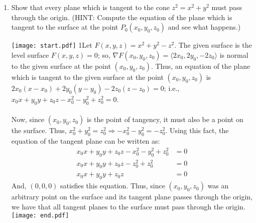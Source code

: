 \documentclass[12pt]{article}
\begin{document}
\begin{enumerate}
\item Show that every plane which is tangent to the cone $z^2=x^2+y^2$ must pass through the origin. (HINT: Compute the equation of the plane which is tangent to the surface at the point $P_0(x_0,y_0,z_0)$ and see what happens.)

\texttt{[image: start.pdf]}
{{{1\linewidth}{Let $F(x,y,z)=x^2+y^2-z^2$.  The given surface is the level surface $F(x,y,z)=0$; so, $\nabla F(x_0,y_0,z_0)=\langle 2x_0,2y_0,-2z_0\rangle$ is normal to the given surface at the  point $(x_0,y_0,z_0)$.  Thus, an equation of the plane which is tangent to the given surface at the point $(x_0,y_0,z_0)$ is $2x_0(x-x_0)+2y_0(y-y_0)-2z_0(z-z_0)=0$; i.e., $x_0x+y_0y+z_0z-x_0^2-y_0^2+z_0^2=0$.\\
\\
Now, since $(x_0,y_0,z_0)$ is the point of tangency, it must also be a point on the surface.  Thus, $x_0^2+y_0^2=z_0^2 \Rightarrow -x_0^2-y_0^2=-z_0^2$.  Using this fact, the equation of the tangent plane can be written as:
\begin{align*}
x_0x+y_0y+z_0z-x_0^2-y_0^2+z_0^2&=0\\
x_0x+y_0y+z_0z-z_0^2+z_0^2&=0\\
x_0x+y_0y+z_0z&=0
\end{align*}
And, $(0,0,0)$ satisfies this equation.  Thus, since $(x_0,y_0,z_0)$ was an arbitrary point on the surface and its tangent plane passes through the origin, we have that all tangent planes to the surface must pass through the origin. 
}}}
\texttt{[image: end.pdf]}


\end{enumerate}
\end{document}
